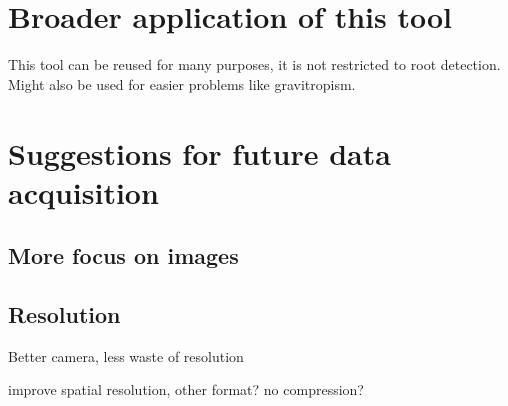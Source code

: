 \section{Broader application of this tool}

This tool can be reused for many purposes, it is not restricted to root detection.
Might also be used for easier problems like gravitropism.



\section{Suggestions for future data acquisition}


\subsection{More focus on images}


\subsection{Resolution}

Better camera, less waste of resolution

improve spatial resolution, other format? no compression?


